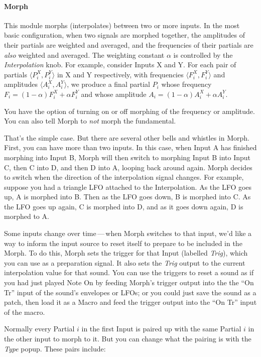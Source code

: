 \documentclass{article}
\begin{document}
\paragraph{Morph} This module morphs (interpolates) between two or more inputs.  In the most basic configuration, when two signals are morphed together, the amplitudes of their partials are weighted and averaged, and the frequencies of their partials are {\it also} weighted and averaged.  The weighting constant \(\alpha\) is controlled by the {\it Interpolation} knob.  For example, consider Inputs X and Y.  For each pair of partials \(\langle P^X_i, P^Y_i\rangle\) in X and Y respectively, with frequencies \(\langle F^X_i, F^Y_i\rangle\) and amplitudes \(\langle A^X_i, A^Y_i\rangle\), we produce a final partial \(P_i\) whose frequency \(F_i = (1-\alpha) F^X_i + \alpha F^Y_i\) and whose amplitude \(A_i = (1-\alpha) A^X_i + \alpha A^Y_i\).

You have the option of turning on or off morphing of the frequency or amplitude.  You can also tell Morph to {\it not} morph the fundamental.  

That's the simple case.  But there are several other bells and whistles in Morph.  First, you can have more than two inputs.  In this case, when Input A has finished morphing into Input B, Morph will then switch to morphing Input B into Input C, then C into D, and then D into A, looping back around again.  Morph decides to switch when the direction of the interpolation signal changes.  For example, suppose you had a triangle LFO attached to the Interpolation.  As the LFO goes up, A is morphed into B.  Then as the LFO goes down, B is morphed into C.  As the LFO goes up again, C is morphed into D, and as it goes down again, D is morphed to A.  

Some inputs change over time\,---\,when Morph switches to that input, we'd like a way to inform the input source to reset itself to prepare to be included in the Morph.  To do this, Morph sets the trigger for that Input (labelled {\it Trig}), which you can use as a preparation signal.  It also sets the {\it Trig} output to the current interpolation value for that sound.  You can use the triggers to reset a sound as if you had just played Note On by feeding Morph's trigger output into the the ``On Tr'' input of the sound's envelopes or LFOs; or you could just save the sound as a patch, then load it as a Macro and feed the trigger output into the ``On Tr'' input of the macro. 

Normally every Partial \(i\) in the first Input is paired up with the same Partial \(i\) in the other input to morph to it.  But you can change what the pairing is with the {\it Type} popup.  These pairs include:
\end{document}
